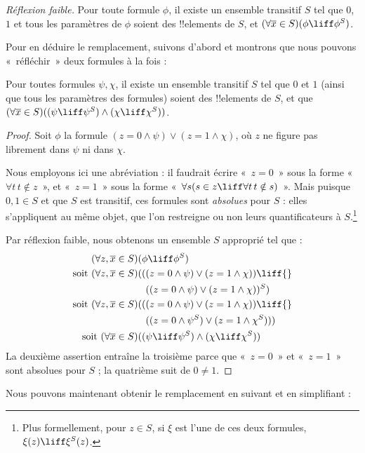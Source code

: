\documentclass[../../../include/open-logic-section]{subfiles}
\begin{document}
\begin{defish}
\emph{Réflexion faible.} Pour toute formule $\phi$,
il existe un ensemble transitif $S$ tel que $0$, $1$
et tous les paramètres de $\phi$ soient des !!{element}s
de $S$, et
$(\forall \overline{x} \in S)(\phi \liff \phi^S)$.
\end{defish}

Pour en déduire le remplacement, suivons d'abord
\citet[première partie du théorème 2]{Levy1960} et montrons
que nous pouvons «~réfléchir~» deux formules à la fois :

\begin{lem}
Pour toutes formules $\psi, \chi$, il existe un ensemble
transitif $S$ tel que $0$ et $1$ (ainsi que tous les
paramètres des formules) soient des !!{element}s de $S$,
et que
$(\forall \overline{x} \in S)((\psi \liff \psi^S)
\land (\chi \liff \chi^S))$.
\end{lem}

\begin{proof}
Soit $\phi$ la formule
$(z = 0 \land \psi) \lor (z = 1 \land \chi)$, où $z$ ne figure pas librement dans $\psi$ ni dans $\chi$.

Nous employons ici une abréviation : il faudrait écrire
«~$z = 0$~» sous la forme
«~$\forall t\, t \notin z$~», et «~$z =1$~»
sous la forme
«~$\forall s(s \in z \liff \forall t\, t \notin s)$~».
Mais puisque $0, 1 \in S$ et que $S$ est transitif,
ces formules sont \emph{absolues} pour $S$ :
elles s'appliquent au même objet, que l'on restreigne
ou non leurs quantificateurs à $S$.\footnote{Plus
formellement, pour $z \in S$, si $\xi$ est l'une de ces deux formules,
$\xi(z) \liff \xi^S(z)$.}

Par réflexion faible, nous obtenons un ensemble $S$
approprié tel que :
\begin{align*}
	(\forall z, \overline{x} \in S)(&\phi \liff \phi^S)\\
	\text{soit }(\forall z, \overline{x} \in S)(&((z = 0 \land \psi) \lor (z = 1 \land \chi)) \liff {}\\
	&\phantom{(}((z = 0 \land \psi) \lor (z = 1 \land \chi))^S)\\
	\text{soit }(\forall z, \overline{x} \in S)(&((z = 0 \land \psi) \lor (z = 1 \land \chi))\liff {}\\
	&\phantom{(}((z = 0 \land \psi^S) \lor (z = 1 \land \chi^S)))\\
	\text{soit }(\forall \overline{x} \in S)(&(\psi \liff \psi^S) \land (\chi \liff \chi^S))
\end{align*}
La deuxième assertion entraîne la troisième parce que
«~$z = 0$~» et «~$z=1$~» sont absolues pour $S$ ;
la quatrième suit de $0 \neq 1$.
\end{proof}\noindent
Nous pouvons maintenant obtenir le remplacement en
suivant et en simplifiant
\citet[théorème 6]{Levy1960} :
\end{document}
